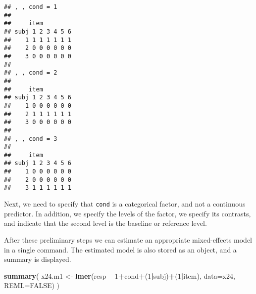 \documentclass[]{book}
\newenvironment{Shaded}{\begin{snugshade}}{\end{snugshade}}
\newcommand{\DataTypeTok}[1]{\textcolor[rgb]{0.13,0.29,0.53}{#1}}
\newcommand{\DecValTok}[1]{\textcolor[rgb]{0.00,0.00,0.81}{#1}}
\newcommand{\KeywordTok}[1]{\textcolor[rgb]{0.13,0.29,0.53}{\textbf{#1}}}
\newcommand{\NormalTok}[1]{#1}
\newcommand{\OperatorTok}[1]{\textcolor[rgb]{0.81,0.36,0.00}{\textbf{#1}}}
\newcommand{\OtherTok}[1]{\textcolor[rgb]{0.56,0.35,0.01}{#1}}
\newcommand{\StringTok}[1]{\textcolor[rgb]{0.31,0.60,0.02}{#1}}
\begin{document}
\begin{verbatim}
## , , cond = 1
## 
##     item
## subj 1 2 3 4 5 6
##    1 1 1 1 1 1 1
##    2 0 0 0 0 0 0
##    3 0 0 0 0 0 0
## 
## , , cond = 2
## 
##     item
## subj 1 2 3 4 5 6
##    1 0 0 0 0 0 0
##    2 1 1 1 1 1 1
##    3 0 0 0 0 0 0
## 
## , , cond = 3
## 
##     item
## subj 1 2 3 4 5 6
##    1 0 0 0 0 0 0
##    2 0 0 0 0 0 0
##    3 1 1 1 1 1 1
\end{verbatim}

Next, we need to specify that \texttt{cond} is a
categorical factor, and not a continuous predictor. In addition, we
specify the levels of the factor, we specify its contrasts, and indicate
that the second level is the baseline or reference level.

\begin{Shaded}
\end{Shaded}

After these preliminary steps we can estimate an appropriate mixed-effects
model in a single command. The estimated model is also stored as an
object, and a summary is displayed.

\begin{Shaded}
\begin{Highlighting}[]
\KeywordTok{summary}\NormalTok{( x24.m1 <-}\StringTok{ }\KeywordTok{lmer}\NormalTok{(resp }\OperatorTok{~}\StringTok{ }\DecValTok{1}\OperatorTok{+}\NormalTok{cond}\OperatorTok{+}\NormalTok{(}\DecValTok{1}\OperatorTok{|}\NormalTok{subj)}\OperatorTok{+}\NormalTok{(}\DecValTok{1}\OperatorTok{|}\NormalTok{item),}
                        \DataTypeTok{data=}\NormalTok{x24, }\DataTypeTok{REML=}\OtherTok{FALSE}\NormalTok{) )}
\end{Highlighting}
\end{Shaded}
\end{document}
